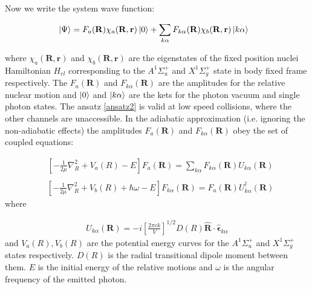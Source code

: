 Now we write the system wave function:

\begin{equation}\label{ansatz2}
\begin{split}
& \Ket{\Psi} = F_a(\mathbf{R})\chi_a(\mathbf{R},\mathbf{r})\Ket{0} + \sum_{k\alpha}{F_{k\alpha}(\mathbf{R})\chi_b(\mathbf{R},\mathbf{r})\Ket{k\alpha}}
\end{split}
\end{equation}

where $ \chi_a(\mathbf{R},\mathbf{r}) $ and $ \chi_b(\mathbf{R},\mathbf{r}) $ are the eigenstates of the fixed position nuclei Hamiltonian $ H_{el} $ corresponding to the $ A^{1}\Sigma^{+}_u $  and $ X^{1}\Sigma^{+}_g $ state in body fixed frame respectively. The $ F_a(\mathbf{R}) $ and $ F_{k\alpha}(\mathbf{R}) $ are the amplitudes for the relative nuclear motion and $ \Ket{0} $ and $ \Ket{k\alpha} $ are the kets for the photon vacuum and single photon states. The ansatz \eqref{ansatz2} is valid at low speed collisions, where the other channels are unaccessible. In the adiabatic approximation (i.e. ignoring the non-adiabatic effects) the amplitudes $ F_a(\mathbf{R}) $ and $ F_{k\alpha}(\mathbf{R}) $ obey the set of coupled equations:

\begin{equation}\label{Fk}
\begin{split}
& \left[-\frac{1}{2\mu}\nabla^2_{R} + V_a(R) - E\right]F_a(\mathbf{R}) = \sum_{k\alpha}{F_{k\alpha}(\mathbf{R})U_{k\alpha}(\mathbf{R}) } \\[.8em]
\end{split}
\end{equation}
\begin{equation}\label{Fka}
\begin{split}
& \left[-\frac{1}{2\mu}\nabla^2_{R} + V_b(R) + \hbar\omega - E\right]F_{k\alpha}(\mathbf{R}) = F_a(\mathbf{R})U^{\dagger}_{k\alpha}(\mathbf{R}) 
\end{split}
\end{equation}
where

\begin{equation}
\begin{split}
U_{k\alpha}(\mathbf{R}) = -i\left[\frac{2\pi c k}{V}\right]^{1/2}D(R)\hat{\mathbf{R}}\cdot\hat{\mathbf{\epsilon}}_{k\alpha}
\end{split}
\end{equation}
and $ V_a(R), V_b(R) $ are the potential energy curves for the $ A^{1}\Sigma^{+}_u $ and $ X^{1}\Sigma^{+}_g $ states respectively.   $ D(R) $ is the radial transitional dipole moment between them. $ E $ is the initial energy of the relative motions and $ \omega $ is the angular frequency of the emitted photon. 

